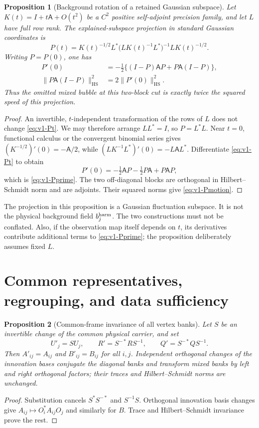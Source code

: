 \documentclass[11pt,a4paper]{article}
\newtheorem{proposition}[proposition]{Proposition}
\theoremstyle{definition}
\theoremstyle{remark}
\newcommand{\norm}[1]{\lVert #1\rVert}
\newcommand{\HS}{\mathrm{HS}}
\begin{document}
\begin{proposition}[Background rotation of a retained Gaussian subspace]
\label{prop:v1-projector-motion}
Let $K(t)=I+t\mathsf A+O(t^2)$ be a $C^2$ positive self-adjoint
precision family, and let $L$ have full row rank. The explained-subspace projection
in standard Gaussian coordinates is
\begin{equation}\label{eq:v1-Pt}
 P(t)=K(t)^{-1/2}L^*
       \bigl(LK(t)^{-1}L^*\bigr)^{-1}LK(t)^{-1/2}.
\end{equation}
Writing $P=P(0)$, one has
\begin{align}
 P'(0)&=-\tfrac12\{(I-P)\mathsf AP+P\mathsf A(I-P)\},
                         \label{eq:v1-Pprime}\\
 \norm{P\mathsf A(I-P)}_\HS^2&=2\norm{P'(0)}_\HS^2.
                         \label{eq:v1-Pmotion}
\end{align}
Thus the omitted mixed bubble at this two-block cut is exactly twice
the squared speed of this projection.
\end{proposition}
\begin{proof}
An invertible, $t$-independent transformation of the rows of $L$ does not
change \cref{eq:v1-Pt}. We may therefore arrange $LL^*=I$, so $P=L^*L$.
Near $t=0$, functional calculus or the convergent binomial series gives
$(K^{-1/2})'(0)=-\mathsf A/2$, while
$(LK^{-1}L^*)'(0)=-L\mathsf AL^*$.
Differentiate \cref{eq:v1-Pt} to obtain
\[
 P'(0)=-\tfrac12\mathsf AP-\tfrac12P\mathsf A+P\mathsf AP,
\]
which is \cref{eq:v1-Pprime}. The two off-diagonal blocks are orthogonal
in Hilbert--Schmidt norm and are adjoints. Their squared norms give
\cref{eq:v1-Pmotion}.
\end{proof}

The projection in this proposition is a Gaussian fluctuation subspace.
It is not the physical background field $b_j^{\rm harm}$. The two
constructions must not be conflated. Also, if the observation map itself
depends on $t$, its derivatives contribute additional terms to
\cref{eq:v1-Pprime}; the proposition deliberately assumes fixed $L$.

\section{Common representatives, regrouping, and data sufficiency}
\label{sec:v1-frames}

\begin{proposition}[Common-frame invariance of all vertex banks]
\label{prop:v1-frame}
Let $S$ be an invertible change of the common physical carrier, and set
\[
 U'_j=SU_j,\qquad R'=S^{-*}RS^{-1},\qquad Q'=S^{-*}QS^{-1}.
\]
Then $A'_{ij}=A_{ij}$ and $B'_{ij}=B_{ij}$ for all $i,j$. Independent
orthogonal changes of the innovation bases conjugate the diagonal banks
and transform mixed banks by left and right orthogonal factors; their
traces and Hilbert--Schmidt norms are unchanged.
\end{proposition}
\begin{proof}
Substitution cancels $S^*S^{-*}$ and $S^{-1}S$. Orthogonal innovation
basis changes give $A_{ij}\mapsto O_i^*A_{ij}O_j$ and similarly for $B$.
Trace and Hilbert--Schmidt invariance prove the rest.
\end{proof}
\end{document}
